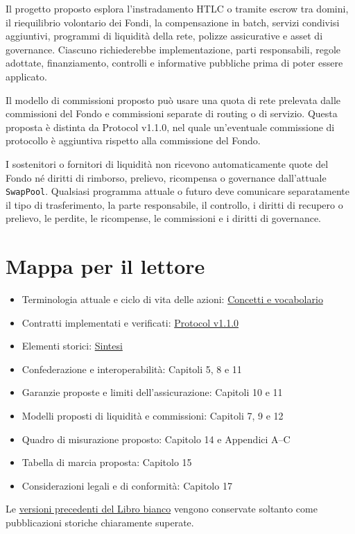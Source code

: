 \documentclass[11pt]{article}
\begin{document}
Il progetto proposto esplora l'instradamento HTLC o tramite escrow tra domini, il riequilibrio volontario dei Fondi, la compensazione in batch, servizi condivisi aggiuntivi, programmi di liquidità della rete, polizze assicurative e asset di governance. Ciascuno richiederebbe implementazione, parti responsabili, regole adottate, finanziamento, controlli e informative pubbliche prima di poter essere applicato.

Il modello di commissioni proposto può usare una quota di rete prelevata dalle commissioni del Fondo e commissioni separate di routing o di servizio. Questa proposta è distinta da Protocol v1.1.0, nel quale un'eventuale commissione di protocollo è aggiuntiva rispetto alla commissione del Fondo.

I sostenitori o fornitori di liquidità non ricevono automaticamente quote del Fondo né diritti di rimborso, prelievo, ricompensa o governance dall'attuale \texttt{SwapPool}. Qualsiasi programma attuale o futuro deve comunicare separatamente il tipo di trasferimento, la parte responsabile, il controllo, i diritti di recupero o prelievo, le perdite, le ricompense, le commissioni e i diritti di governance.

\section*{Mappa per il lettore}

\begin{itemize}[leftmargin=*]
\item Terminologia attuale e ciclo di vita delle azioni: \href{https://docs.cosmolocal.credit/it/introduction/concepts}{Concetti e vocabolario}
\item Contratti implementati e verificati: \href{https://docs.cosmolocal.credit/it/protocol/overview}{Protocol v1.1.0}
\item Elementi storici: \href{https://docs.cosmolocal.credit/it/white-paper/executive-summary}{Sintesi}
\item Confederazione e interoperabilità: Capitoli 5, 8 e 11
\item Garanzie proposte e limiti dell'assicurazione: Capitoli 10 e 11
\item Modelli proposti di liquidità e commissioni: Capitoli 7, 9 e 12
\item Quadro di misurazione proposto: Capitolo 14 e Appendici A--C
\item Tabella di marcia proposta: Capitolo 15
\item Considerazioni legali e di conformità: Capitolo 17
\end{itemize}
Le \href{https://docs.cosmolocal.credit/it/white-paper/archive}{versioni precedenti del Libro bianco} vengono conservate soltanto come pubblicazioni storiche chiaramente superate.
\end{document}
